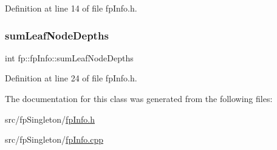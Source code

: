 Definition at line 14 of file fp\+Info.\+h.

\mbox{\label{classfp_1_1fpInfo_a13afa17097728f059e8525ea382b71cd}} 
\subsubsection{\texorpdfstring{sum\+Leaf\+Node\+Depths}{sumLeafNodeDepths}}
{\footnotesize\ttfamily int fp\+::fp\+Info\+::sum\+Leaf\+Node\+Depths\hspace{0.3cm}{\ttfamily [protected]}}



Definition at line 24 of file fp\+Info.\+h.



The documentation for this class was generated from the following files\+:\begin{DoxyCompactItemize}
\item 
src/fp\+Singleton/\hyperlink{fpInfo_8h}{fp\+Info.\+h}\item 
src/fp\+Singleton/\hyperlink{fpInfo_8cpp}{fp\+Info.\+cpp}\end{DoxyCompactItemize}
